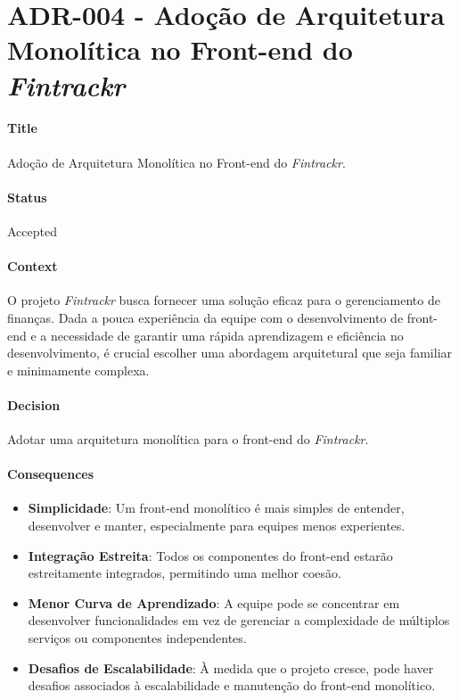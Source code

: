 
\chapter{ADR-004 - Adoção de Arquitetura Monolítica no Front-end do \textit{Fintrackr}}
\label{apendiceADR004}

\subsubsection*{Title}
Adoção de Arquitetura Monolítica no Front-end do \textit{Fintrackr}.

\subsubsection*{Status}
Accepted

\subsubsection*{Context}
O projeto \textit{Fintrackr} busca fornecer uma solução eficaz para o gerenciamento de finanças. Dada a pouca experiência da equipe com o desenvolvimento de front-end e a necessidade de garantir uma rápida aprendizagem e eficiência no desenvolvimento, é crucial escolher uma abordagem arquitetural que seja familiar e minimamente complexa.

\subsubsection*{Decision}
Adotar uma arquitetura monolítica para o front-end do \textit{Fintrackr}.

\subsubsection*{Consequences}
\begin{itemize}
    \item \textbf{Simplicidade}: Um front-end monolítico é mais simples de entender, desenvolver e manter, especialmente para equipes menos experientes.
    \item \textbf{Integração Estreita}: Todos os componentes do front-end estarão estreitamente integrados, permitindo uma melhor coesão.
    \item \textbf{Menor Curva de Aprendizado}: A equipe pode se concentrar em desenvolver funcionalidades em vez de gerenciar a complexidade de múltiplos serviços ou componentes independentes.
    \item \textbf{Desafios de Escalabilidade}: À medida que o projeto cresce, pode haver desafios associados à escalabilidade e manutenção do front-end monolítico.
\end{itemize}

\newpage
